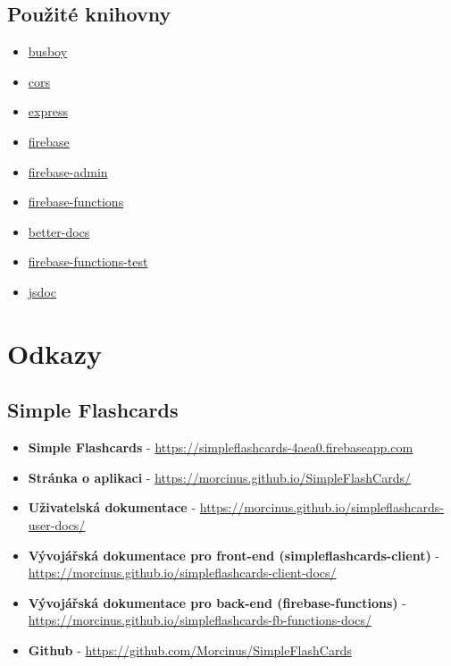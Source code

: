 \documentclass[a4paper,12pt]{article}
\begin{document}
\subsection{Použité knihovny}
\begin{itemize}
\item
  \href{https://www.npmjs.com/package/busboy}{busboy}
\item
  \href{https://www.npmjs.com/package/cors}{cors}
\item
  \href{https://www.npmjs.com/package/express}{express}
\item
  \href{https://www.npmjs.com/package/firebase}{firebase}
\item
  \href{https://www.npmjs.com/package/firebase-admin}{firebase-admin}
\item
  \href{https://www.npmjs.com/package/firebase-functions}{firebase-functions}
\item
  \href{https://www.npmjs.com/package/better-docs}{better-docs}
\item
  \href{https://www.npmjs.com/package/firebase-functions-test}{firebase-functions-test}
\item
  \href{https://www.npmjs.com/package/jsdoc}{jsdoc}
\end{itemize}

\section{Odkazy}
\subsection{Simple Flashcards}
\begin{itemize}
\item \textbf{Simple Flashcards} - \href{https://simpleflashcards-4aea0.firebaseapp.com}{https://simpleflashcards-4aea0.firebaseapp.com}
\item \textbf{Stránka o aplikaci} - \href{https://morcinus.github.io/SimpleFlashCards/}{https://morcinus.github.io/SimpleFlashCards/}
\item \textbf{Uživatelská dokumentace} - \href{https://morcinus.github.io/simpleflashcards-user-docs/}{https://morcinus.github.io/simpleflashcards-user-docs/}
\item \textbf{Vývojářská dokumentace pro front-end (simpleflashcards-client)} - \href{https://morcinus.github.io/simpleflashcards-client-docs/}{https://morcinus.github.io/simpleflashcards-client-docs/}
\item \textbf{Vývojářská dokumentace pro back-end (firebase-functions)} - \href{https://morcinus.github.io/simpleflashcards-fb-functions-docs/}{https://morcinus.github.io/simpleflashcards-fb-functions-docs/}
\item \textbf{Github} - \href{https://github.com/Morcinus/SimpleFlashCards}{https://github.com/Morcinus/SimpleFlashCards}
\end{itemize}
\end{document}

